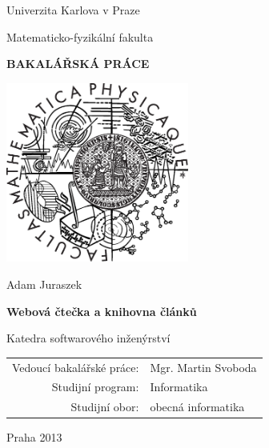 
\pagestyle{empty}
\begin{center}

\large

Univerzita Karlova v Praze

\medskip

Matematicko-fyzikální fakulta

\vfill

{\bf\Large BAKALÁŘSKÁ PRÁCE}

\vfill

\centerline{\mbox{\includegraphics[width=60mm]{img/logo.eps}}}

\vfill
\vspace{5mm}

{\LARGE Adam Juraszek}

\vspace{15mm}

{\LARGE\bfseries Webová čtečka a knihovna článků}

\vfill

Katedra softwarového inženýrství

\vfill

\begin{tabular}{rl}

Vedoucí bakalářské práce: & Mgr. Martin Svoboda \\
\noalign{\vspace{2mm}}
Studijní program: & Informatika \\
\noalign{\vspace{2mm}}
Studijní obor: & obecná informatika \\
\end{tabular}

\vfill

Praha 2013

\end{center}
